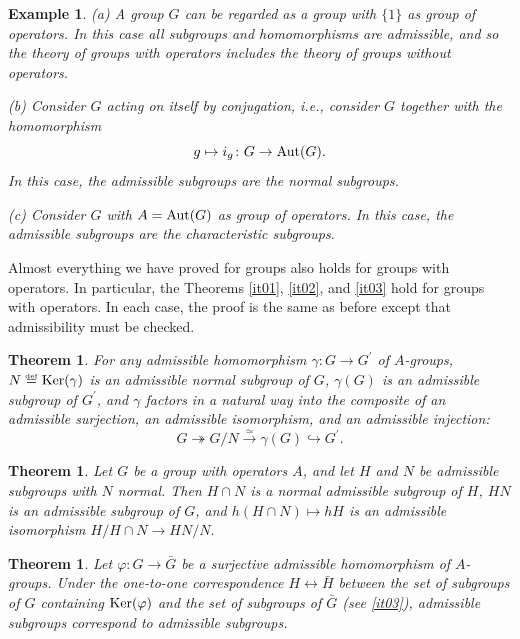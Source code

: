 \documentclass[a4paper,11pt,final,openany]{memoir}%
\newtheorem{theorem}[X]{Theorem}
\newtheorem{example}[X]{Example}
\theoremstyle{nonumberplain}
\begin{document}
\begin{example}
\label{ns23}(a) A group $G$ can be regarded as a group with $\{1\}$ as group
of operators. In this case all subgroups and homomorphisms are admissible, and
so the theory of groups with operators includes the theory of groups without operators.

(b) Consider $G$ acting on itself by conjugation, i.e., consider $G$ together
with the homomorphism
\[
g\mapsto i_{g}\colon G\rightarrow\operatorname{Aut}(G).
\]
In this case, the admissible subgroups are the normal subgroups.

(c) Consider $G$ with $A=\operatorname{Aut}(G)$ as group of operators. In this case, the
admissible subgroups are the characteristic subgroups.
\end{example}

Almost everything we have proved for groups also holds for groups with
operators. In particular, the Theorems \ref{it01}, \ref{it02}, and \ref{it03}
hold for groups with operators. In each case, the proof is the same as before
except that admissibility must be checked.

\begin{theorem}
\label{ns24}For any admissible homomorphism $\gamma\colon G\rightarrow
G^{\prime}$ of $A$-groups, $N\overset{\df}{=}\Ker(\gamma)$ is
an admissible normal subgroup of $G$, $\gamma(G)$ is an admissible subgroup of
$G^{\prime}$, and $\gamma$ factors in a natural way into the composite of an
admissible surjection, an admissible isomorphism, and an admissible
injection:
\[
G\twoheadrightarrow G/N\overset{\simeq}{\rightarrow}\gamma(G)\hookrightarrow
G^{\prime}.
\]

\end{theorem}

\begin{theorem}
\label{ns25}Let $G$ be a group with operators $A$, and let $H$ and $N$ be
admissible subgroups with $N$ normal. Then $H\cap N$ is a normal admissible
subgroup of $H$, $HN$ is an admissible subgroup of $G$, and $h(H\cap N)\mapsto
hH$ is an admissible isomorphism $H/H\cap N\rightarrow HN/N.$
\end{theorem}

\begin{theorem}
\label{ns26}Let $\varphi\colon G\rightarrow\bar{G}$ be a surjective admissible
homomorphism of $A$-groups. Under the one-to-one correspondence
$H\leftrightarrow\bar{H}$ between the set of subgroups of $G$ containing
$\operatorname{Ker}(\varphi)$ and the set of subgroups of $\bar{G}$ (see \ref{it03}),
admissible subgroups correspond to admissible subgroups.
\end{theorem}
\end{document}
